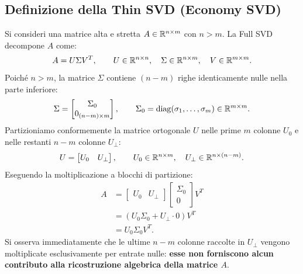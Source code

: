 \subsection{Definizione della Thin SVD (Economy SVD)}

Si consideri una matrice alta e stretta $A \in \mathbb{R}^{n \times m}$ con $n > m$. La Full SVD decompone $A$ come:
\begin{equation}
    A = U \Sigma V^T, \qquad U \in \mathbb{R}^{n \times n}, \quad \Sigma \in \mathbb{R}^{n \times m}, \quad V \in \mathbb{R}^{m \times m}.
\end{equation}
Poich\'e $n > m$, la matrice $\Sigma$ contiene $(n - m)$ righe identicamente nulle nella parte inferiore:
\begin{equation}
    \Sigma = \begin{bmatrix} \Sigma_0 \\ 0_{(n-m) \times m} \end{bmatrix}, \qquad \Sigma_0 = \operatorname{diag}(\sigma_1, \dots, \sigma_m) \in \mathbb{R}^{m \times m}.
\end{equation}
Partizioniamo conformemente la matrice ortogonale $U$ nelle prime $m$ colonne $U_0$ e nelle restanti $n - m$ colonne $U_\perp$:
\begin{equation}
    U = \begin{bmatrix} U_0 & U_\perp \end{bmatrix}, \qquad U_0 \in \mathbb{R}^{n \times m}, \quad U_\perp \in \mathbb{R}^{n \times (n - m)}.
\end{equation}
Eseguendo la moltiplicazione a blocchi di partizione:
\begin{align}
    A &= \begin{bmatrix} U_0 & U_\perp \end{bmatrix} \begin{bmatrix} \Sigma_0 \\ 0 \end{bmatrix} V^T \nonumber \\
      &= \left( U_0 \Sigma_0 + U_\perp \cdot 0 \right) V^T \nonumber \\
      &= U_0 \Sigma_0 V^T.
\end{align}
Si osserva immediatamente che le ultime $n - m$ colonne raccolte in $U_\perp$ vengono moltiplicate esclusivamente per entrate nulle: \textbf{esse non forniscono alcun contributo alla ricostruzione algebrica della matrice $A$}.

